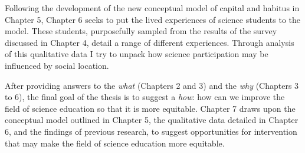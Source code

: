 Following the development of the new conceptual model of capital and habitus in Chapter 5, Chapter 6 seeks to put the lived experiences of science students to the model. These students, purposefully sampled from the results of the survey discussed in Chapter 4, detail a range of different experiences. Through analysis of this qualitative data I try to unpack how science participation may be influenced by social location. 

After providing answers to the \textit{what} (Chapters 2 and 3) and the \textit{why} (Chapters 3 to 6), the final goal of the thesis is to suggest a \textit{how}: how can we improve the field of science education so that it is more equitable. Chapter 7 draws upon the conceptual model outlined in Chapter 5, the qualitative data detailed in Chapter 6, and the findings of previous research, to suggest opportunities for intervention that may make the field of science education more equitable. 


